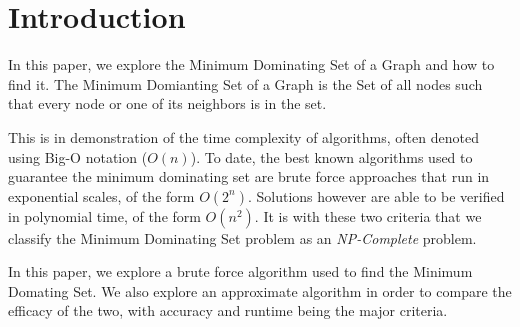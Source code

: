 \documentclass[paper.tex]{subfiles}
\begin{document}
\section{Introduction}

In this paper, we explore the Minimum Dominating Set of a Graph and how to find it.
The Minimum Domianting Set of a Graph is the Set of all nodes such that every node or one of its neighbors is in the set.

This is in demonstration of the time complexity of algorithms, often denoted using Big-O notation ($O(n)$).
To date, the best known algorithms used to guarantee the minimum dominating set are brute force approaches that run in exponential scales, of the form $O(2^n)$.
Solutions however are able to be verified in polynomial time, of the form $O(n^2)$.
It is with these two criteria that we classify the Minimum Dominating Set problem as an \textit{NP-Complete} problem.

In this paper, we explore a brute force algorithm used to find the Minimum Domating Set.
We also explore an approximate algorithm in order to compare the efficacy of the two, with accuracy and runtime being the major criteria.
\end{document}
